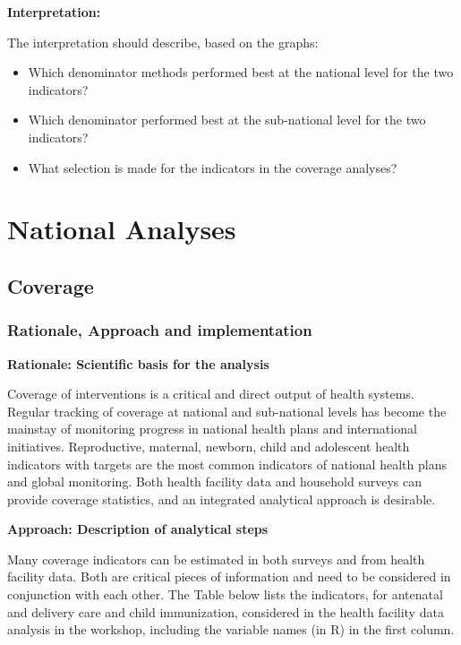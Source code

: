 \documentclass[
  english,
  letterpaper,
  DIV=11,
  numbers=noendperiod]{scrreprt}
\providecommand{\tightlist}{%
  \setlength{\itemsep}{0pt}\setlength{\parskip}{0pt}}
\begin{document}
\textbf{Interpretation:}

The interpretation should describe, based on the graphs:

\begin{itemize}
\tightlist
\item
  Which denominator methods performed best at the national level for the
  two indicators?
\item
  Which denominator performed best at the sub-national level for the two
  indicators?
\item
  What selection is made for the indicators in the coverage analyses?
\end{itemize}

\part{National Analyses}

\chapter{Coverage}\label{coverage}

\section{Rationale, Approach and
implementation}\label{rationale-approach-and-implementation-1}

\textbf{Rationale: Scientific basis for the analysis}

Coverage of interventions is a critical and direct output of health
systems. Regular tracking of coverage at national and sub-national
levels has become the mainstay of monitoring progress in national health
plans and international initiatives. Reproductive, maternal, newborn,
child and adolescent health indicators with targets are the most common
indicators of national health plans and global monitoring. Both health
facility data and household surveys can provide coverage statistics, and
an integrated analytical approach is desirable.

\textbf{Approach: Description of analytical steps}

Many coverage indicators can be estimated in both surveys and from
health facility data. Both are critical pieces of information and need
to be considered in conjunction with each other. The Table below lists
the indicators, for antenatal and delivery care and child immunization,
considered in the health facility data analysis in the workshop,
including the variable names (in R) in the first column.
\end{document}
